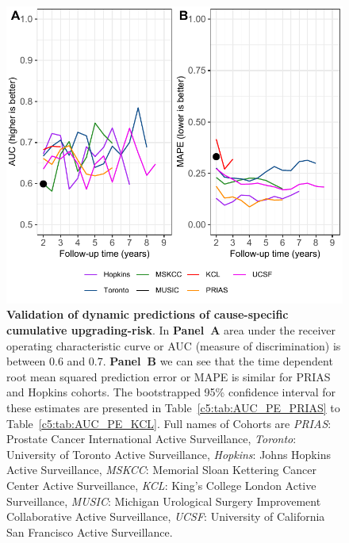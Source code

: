 \begin{subappendices}
\begin{figure}
\centerline{\includegraphics{contents/c5/images/c5_fig_app4.pdf}}
\caption{\textbf{Validation of dynamic predictions of cause-specific cumulative upgrading-risk}. In \textbf{Panel~A} area under the receiver operating characteristic curve or AUC (measure of discrimination) is between 0.6 and 0.7. \textbf{Panel~B} we can see that the time dependent root mean squared prediction error or MAPE is similar for PRIAS and Hopkins cohorts. The bootstrapped 95\% confidence interval for these estimates are presented in Table~\ref{c5:tab:AUC_PE_PRIAS} to Table~\ref{c5:tab:AUC_PE_KCL}. Full names of Cohorts are \textit{PRIAS}: Prostate Cancer International Active Surveillance, \textit{Toronto}: University of Toronto Active Surveillance, \textit{Hopkins}: Johns Hopkins Active Surveillance, \textit{MSKCC}: Memorial Sloan Kettering Cancer Center Active Surveillance, \textit{KCL}: King's College London Active Surveillance, \textit{MUSIC}: Michigan Urological Surgery Improvement Collaborative Active Surveillance, \textit{UCSF}: University of California San Francisco Active Surveillance.}
\label{c5:fig:auc_pe_recalib}
\end{figure}


\end{subappendices}

